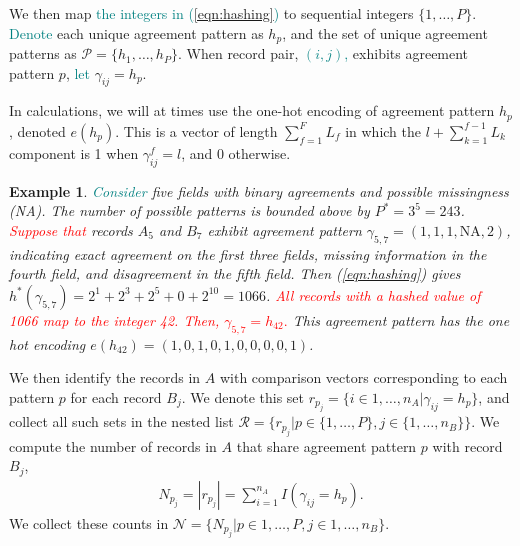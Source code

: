 \documentclass[ba]{imsart}
\newtheorem{example}{Example}
\begin{document}
We then map \textcolor{teal}{the integers in (\ref{eqn:hashing})} to sequential integers $\{1, \ldots, P\}$. \textcolor{teal}{Denote} each unique agreement pattern as $h_p$, and the set of unique agreement patterns as $\mathcal{P} = \{h_1, \ldots, h_P\}$. When record pair, \textcolor{teal}{$(i,j)$,} exhibits agreement pattern $p$, \textcolor{teal}{let} $\gamma_{ij} = h_p$. 

In calculations, we will at times use the one-hot encoding of agreement pattern $h_p$, denoted $e(h_p)$. This is a vector of length $\sum_{f=1}^F L_f$ in which the $l + \sum_{k=1}^{f-1} L_k$ component is 1 when $\gamma_{ij}^f = l$, and 0 otherwise. 


\begin{example}
\label{ex:one-hot}
\textcolor{teal}{Consider} five fields with binary agreements and possible missingness (NA). The number of possible patterns is bounded above by $P^{*} = 3^5 = 243$. \textcolor{red}{Suppose that} records $A_5$ and $B_7$ exhibit agreement pattern $\gamma_{5,7} = (1, 1, 1, \text{NA}, 2)$, indicating exact agreement on the first three fields, missing information in the fourth field, and disagreement in the fifth field. Then (\ref{eqn:hashing}) gives $h^{*}(\gamma_{5,7}) = 2^1 + 2^3 + 2^5 + 0 + 2^{10} = 1066$. 
\textcolor{red}{All records with a hashed value of 1066 map to the integer 42. Then, $\gamma_{5,7} = h_{42}.$}
This agreement pattern has the one hot encoding $e(h_{42}) = (1, 0, 1, 0, 1, 0, 0, 0, 0, 1)$.
\end{example}

We then identify the records in $A$ with comparison vectors corresponding to each pattern $p$ for each record $B_j$. We denote this set $r_{p_j} = \{i \in 1, \dots, n_A | \gamma_{ij} = h_p\}$, and collect all such sets in the nested list $\mathcal{R} = \{r_{p_j} | p \in \{1, \ldots, P\}, j \in \{1, \ldots, n_B\} \}$. We compute the number of records in $A$ that share agreement pattern $p$ with record $B_j$, 
\begin{align}\label{eqn:N}
N_{p_j} = |r_{p_j}| = \sum_{i=1}^{n_A} I(\gamma_{ij} = h_p).
\end{align}
We collect these counts in $\mathcal{N} = \{N_{p_j} |p \in 1, \ldots, P, j \in 1, \ldots, n_B \}$. 
\end{document}
